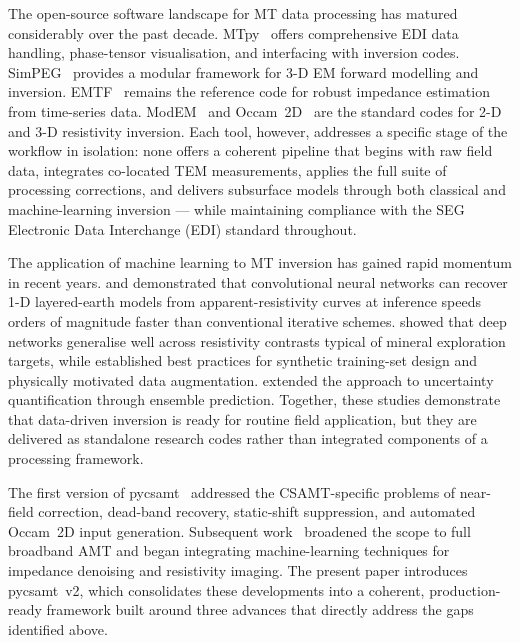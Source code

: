 \documentclass[review,12pt]{elsarticle}
\begin{document}
The open-source software landscape for MT data processing has matured
considerably over the past decade.
MTpy~\citep{Kirkby2019} offers comprehensive EDI data handling,
phase-tensor visualisation, and interfacing with inversion codes.
SimPEG~\citep{Cockett2015} provides a modular framework for 3-D EM
forward modelling and inversion.
EMTF~\citep{Egbert1997} remains the reference code for robust
impedance estimation from time-series data.
ModEM~\citep{Kelbert2014} and Occam~2D~\citep{deGrootHedlin1990} are the
standard codes for 2-D and 3-D resistivity inversion.
Each tool, however, addresses a specific stage of the workflow in isolation:
none offers a coherent pipeline that begins with raw field data, integrates
co-located TEM measurements, applies the full suite of processing
corrections, and delivers subsurface models through both classical and
machine-learning inversion — while maintaining compliance with the SEG
Electronic Data Interchange (EDI) standard throughout.

The application of machine learning to MT inversion has gained rapid
momentum in recent years.
\citet{Liu2021} and \citet{Guo2021} demonstrated that convolutional neural
networks can recover 1-D layered-earth models from apparent-resistivity
curves at inference speeds orders of magnitude faster than conventional
iterative schemes.
\citet{Oh2019,Oh2020} showed that deep networks generalise well across
resistivity contrasts typical of mineral exploration targets, while
\citet{Puzyrev2019,Puzyrev2021} established best practices for synthetic
training-set design and physically motivated data augmentation.
\citet{Moghadas2020} extended the approach to uncertainty quantification
through ensemble prediction.
Together, these studies demonstrate that data-driven inversion is ready for
routine field application, but they are delivered as standalone research
codes rather than integrated components of a processing framework.

The first version of pycsamt~\citep{Kouadio2023} addressed the CSAMT-specific
problems of near-field correction, dead-band recovery, static-shift
suppression, and automated Occam~2D input generation.
Subsequent work~\citep{Kouadio2024,Kouadio2025} broadened the scope to
full broadband AMT and began integrating machine-learning techniques for
impedance denoising and resistivity imaging.
The present paper introduces pycsamt~v2, which consolidates these
developments into a coherent, production-ready framework built around three
advances that directly address the gaps identified above.
\end{document}
